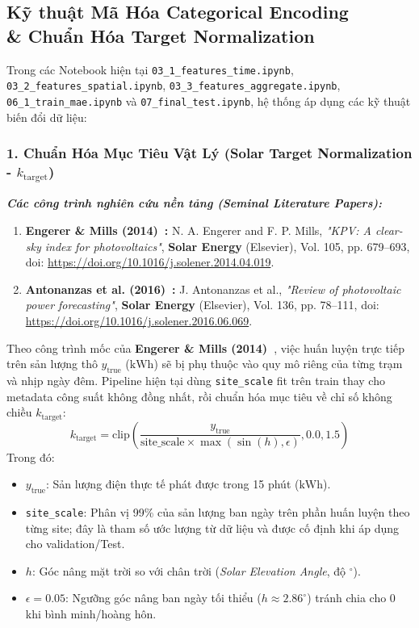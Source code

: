 \documentclass[12pt,a4paper]{article}
\begin{document}
\subsection[Kỹ thuật Mã Hóa \& Chuẩn Hóa]{Kỹ thuật Mã Hóa Categorical Encoding\\\& Chuẩn Hóa Target Normalization}
Trong các Notebook hiện tại \texttt{03\_1\_features\_time.ipynb}, \texttt{03\_2\_features\_spatial.ipynb}, \texttt{03\_3\_features\_aggregate.ipynb}, \texttt{06\_1\_train\_mae.ipynb} và \texttt{07\_final\_test.ipynb}, hệ thống áp dụng các kỹ thuật biến đổi dữ liệu:

\subsubsection{1. Chuẩn Hóa Mục Tiêu Vật Lý (Solar Target Normalization - \texorpdfstring{$k_{\text{target}}$}{k_target})}
\textit{\textbf{Các công trình nghiên cứu nền tảng (Seminal Literature Papers):}}
\begin{enumerate}
    \item \textbf{Engerer \& Mills (2014)~\cite{engerer2014kpv}:} N. A. Engerer and F. P. Mills, \textit{"KPV: A clear-sky index for photovoltaics"}, \textbf{Solar Energy} (Elsevier), Vol. 105, pp. 679--693, doi: \url{https://doi.org/10.1016/j.solener.2014.04.019}.
    \item \textbf{Antonanzas et al. (2016)~\cite{antonanzas2016review}:} J. Antonanzas et al., \textit{"Review of photovoltaic power forecasting"}, \textbf{Solar Energy} (Elsevier), Vol. 136, pp. 78--111, doi: \url{https://doi.org/10.1016/j.solener.2016.06.069}.
\end{enumerate}

Theo công trình mốc của \textbf{Engerer \& Mills (2014)~\cite{engerer2014kpv}}, việc huấn luyện trực tiếp trên sản lượng thô $y_{\text{true}}$ ($\text{kWh}$) sẽ bị phụ thuộc vào quy mô riêng của từng trạm và nhịp ngày đêm. Pipeline hiện tại dùng \texttt{site\_scale} fit trên train thay cho metadata công suất không đồng nhất, rồi chuẩn hóa mục tiêu về chỉ số không chiều $k_{\text{target}}$:
\begin{equation}
    k_{\text{target}} = \text{clip}\left(\frac{y_{\text{true}}}{\text{site\_scale} \times \max(\sin(h), \epsilon)}, 0.0, 1.5\right)
\end{equation}
Trong đó:
\begin{itemize}
    \item $y_{\text{true}}$: Sản lượng điện thực tế phát được trong 15 phút ($\text{kWh}$).
    \item \texttt{site\_scale}: Phân vị 99\% của sản lượng ban ngày trên phần huấn luyện theo từng site; đây là tham số ước lượng từ dữ liệu và được cố định khi áp dụng cho validation/Test.
    \item $h$: Góc nâng mặt trời so với chân trời (\textit{Solar Elevation Angle}, độ $^\circ$).
    \item $\epsilon = 0.05$: Ngưỡng góc nâng ban ngày tối thiểu ($h \approx 2.86^\circ$) tránh chia cho 0 khi bình minh/hoàng hôn.
\end{itemize}
\end{document}
